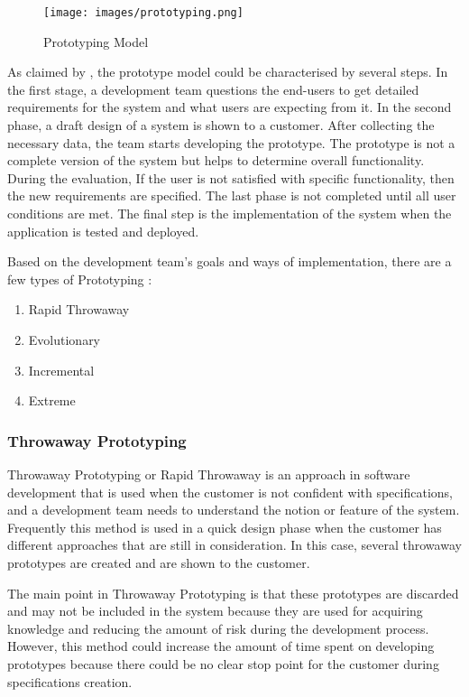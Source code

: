 \documentclass[a4paper]{article}
\begin{document}
    \begin{figure}[H]
     \texttt{[image: images/prototyping.png]}
     \centering
    \caption{Prototyping Model}
    \label{prototypingModel}
    \end{figure}
    
     As claimed by \cite{carr1997prototyping}, the prototype model could be characterised by several steps. In the first stage, a development team questions the end-users to get detailed requirements for the system and what users are expecting from it. In the second phase, a draft design of a system is shown to a customer. After collecting the necessary data, the team starts developing the prototype. The prototype is not a complete version of the system but helps to determine overall functionality. During the evaluation, If the user is not satisfied with specific functionality, then the new requirements are specified. The last phase is not completed until all user conditions are met. The final step is the implementation of the system when the application is tested and deployed. 
     
     Based on the development team's goals and ways of implementation, there are a few types of Prototyping :
     \begin{enumerate}
         \item Rapid Throwaway  
         \item Evolutionary
         \item Incremental
         \item Extreme
     \end{enumerate}

    \subsubsection{Throwaway Prototyping}
     Throwaway Prototyping or Rapid Throwaway is an approach in software development that is used when the customer is not confident with specifications, and a development team needs to understand the notion or feature of the system. Frequently this method is used in a quick design phase when the customer has different approaches that are still in consideration. In this case, several throwaway prototypes are created and are shown to the customer. 
     
     The main point in Throwaway Prototyping is that these prototypes are discarded and may not be included in the system because they are used for acquiring knowledge and reducing the amount of risk during the development process. However, this method could increase the amount of time spent on developing prototypes because there could be no clear stop point for the customer during specifications creation.
    
\end{document}
